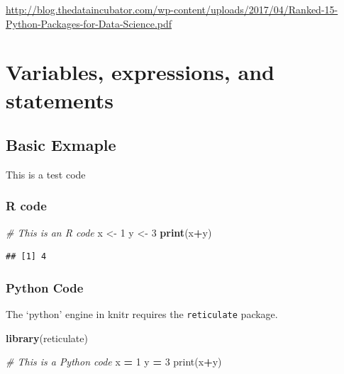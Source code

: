 \documentclass[]{book}
\newenvironment{Shaded}{\begin{snugshade}}{\end{snugshade}}
\newcommand{\BuiltInTok}[1]{#1}
\newcommand{\CommentTok}[1]{\textcolor[rgb]{0.56,0.35,0.01}{\textit{#1}}}
\newcommand{\DecValTok}[1]{\textcolor[rgb]{0.00,0.00,0.81}{#1}}
\newcommand{\KeywordTok}[1]{\textcolor[rgb]{0.13,0.29,0.53}{\textbf{#1}}}
\newcommand{\NormalTok}[1]{#1}
\newcommand{\OperatorTok}[1]{\textcolor[rgb]{0.81,0.36,0.00}{\textbf{#1}}}
\newcommand{\StringTok}[1]{\textcolor[rgb]{0.31,0.60,0.02}{#1}}
\begin{document}
\url{http://blog.thedataincubator.com/wp-content/uploads/2017/04/Ranked-15-Python-Packages-for-Data-Science.pdf}

\hypertarget{variables-expressions-and-statements}{%
\chapter{Variables, expressions, and statements}\label{variables-expressions-and-statements}}

\hypertarget{basic-exmaple}{%
\section{Basic Exmaple}\label{basic-exmaple}}

This is a test code

\hypertarget{r-code}{%
\subsection{R code}\label{r-code}}

\begin{Shaded}
\begin{Highlighting}[]
\CommentTok{# This is an R code}
\NormalTok{x <-}\StringTok{ }\DecValTok{1}
\NormalTok{y <-}\StringTok{ }\DecValTok{3}
\KeywordTok{print}\NormalTok{(x}\OperatorTok{+}\NormalTok{y)}
\end{Highlighting}
\end{Shaded}

\begin{verbatim}
## [1] 4
\end{verbatim}

\hypertarget{python-code}{%
\subsection{Python Code}\label{python-code}}

The `python' engine in knitr requires the \texttt{reticulate} package.

\begin{Shaded}
\begin{Highlighting}[]
\KeywordTok{library}\NormalTok{(reticulate)}
\end{Highlighting}
\end{Shaded}

\begin{Shaded}
\begin{Highlighting}[]
\CommentTok{# This is a Python code}
\NormalTok{x }\OperatorTok{=} \DecValTok{1}
\NormalTok{y }\OperatorTok{=} \DecValTok{3}
\BuiltInTok{print}\NormalTok{(x}\OperatorTok{+}\NormalTok{y)}
\end{Highlighting}
\end{Shaded}
\end{document}
